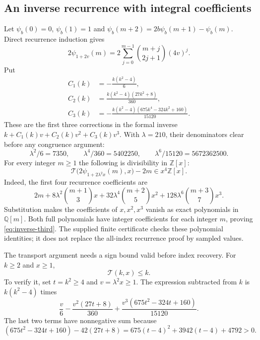 \subsection{An inverse recurrence with integral coefficients}
Let $\psi_b(0)=0$, $\psi_b(1)=1$ and
$\psi_b(m+2)=2b\psi_b(m+1)-\psi_b(m)$. Direct recurrence induction gives
\[
 2\psi_{1+2v}(m)
 =2\sum_{j=0}^{m-1}\binom{m+j}{2j+1}(4v)^j.
\]
Put
\begin{align*}
 C_1(k)&=-\frac{k(k^2-4)}6,\\
 C_2(k)&=\frac{k(k^2-4)(27k^2+8)}{360},\\
 C_3(k)&=-\frac{k(k^2-4)(675k^4-324k^2+160)}{15120}.
\end{align*}
These are the first three corrections in the formal inverse
$k+C_1(k)v+C_2(k)v^2+C_3(k)v^3$. With $\lambda=210$, their denominators
clear before any congruence argument:
\[
 \lambda^2/6=7350,\qquad
 \lambda^4/360=5402250,\qquad
 \lambda^6/15120=5672362500.
\]
For every integer $m\ge1$ the following is divisibility in
$\mathbb Z[x]$:
\begin{equation}\label{eq:inverse-third}
 \mathcal T\bigl(2\psi_{1+2\lambda^2x}(m),x\bigr)-2m
 \in x^4\mathbb Z[x].
\end{equation}
Indeed, the first four recurrence coefficients are
\[
 2m+8\lambda^2\binom{m+1}{3}x
 +32\lambda^4\binom{m+2}{5}x^2
 +128\lambda^6\binom{m+3}{7}x^3.
\]
Substitution makes the coefficients of $x,x^2,x^3$ vanish as exact
polynomials in $\mathbb Q[m]$. Both full polynomials have integer
coefficients for each integer $m$, proving \eqref{eq:inverse-third}.
The supplied finite certificate checks these polynomial identities; it
does not replace the all-index recurrence proof by sampled values.

The transport argument needs a sign bound valid before index recovery.
For $k\ge2$ and $x\ge1$,
\begin{equation}\label{eq:inverse-third-sign}
 \mathcal T(k,x)\le k.
\end{equation}
To verify it, set $t=k^2\ge4$ and $v=\lambda^2x\ge1$. The expression
subtracted from $k$ is $k(k^2-4)$ times
\[
 \frac v6-\frac{v^2(27t+8)}{360}
 +\frac{v^3(675t^2-324t+160)}{15120}.
\]
The last two terms have nonnegative sum because
\[
 (675t^2-324t+160)-42(27t+8)
 =675(t-4)^2+3942(t-4)+4792>0.
\]

